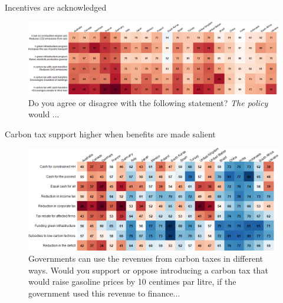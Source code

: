 \begin{frame}{Incentives are acknowledged}
	\begin{figure}[h!]
	\vspace{-.1cm}
	\centering
	\caption{%
Do you agree or disagree with the following statement? \textit{The policy} would ...} %
	\includegraphics[width=\textwidth]{../figures/country_comparison/policies_effects_positive_countries.png}
	\end{figure}
\end{frame}
	
	

\begin{frame}{Carbon tax support higher when benefits are made salient}%
	\begin{figure}[h!]
	\centering
	\caption{Governments can use the revenues from carbon taxes in different ways. Would you support or oppose introducing a carbon tax that would raise gasoline prices by 10 centimes par litre, if the government used this revenue to finance...}
	\vspace{-.2cm}
	\includegraphics[width=\textwidth]{../figures/country_comparison/tax_positive_countries.png}
	\end{figure}
\end{frame}
		
